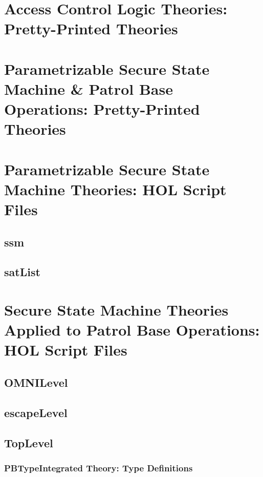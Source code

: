 \documentclass[hidelinks,12pt,a4paper]{report}
\begin{document}
\begin{appendices}

\cleardoublepage

\chapter{Access Control Logic Theories: Pretty-Printed Theories}\label{ppacl}

\chapter{Parametrizable Secure State Machine \& Patrol Base Operations: Pretty-Printed Theories }


\chapter{Parametrizable Secure State Machine Theories: HOL Script Files}\label{app:ssms}
\section{ssm}

\section{satList}



\chapter{Secure State Machine Theories Applied to Patrol Base Operations: HOL Script Files}\label{aap:ssmScript}
\section{OMNILevel}


\section{escapeLevel}
%

\section{TopLevel}
\subsection{PBTypeIntegrated Theory: Type Definitions}


\end{appendices}
\end{document}
